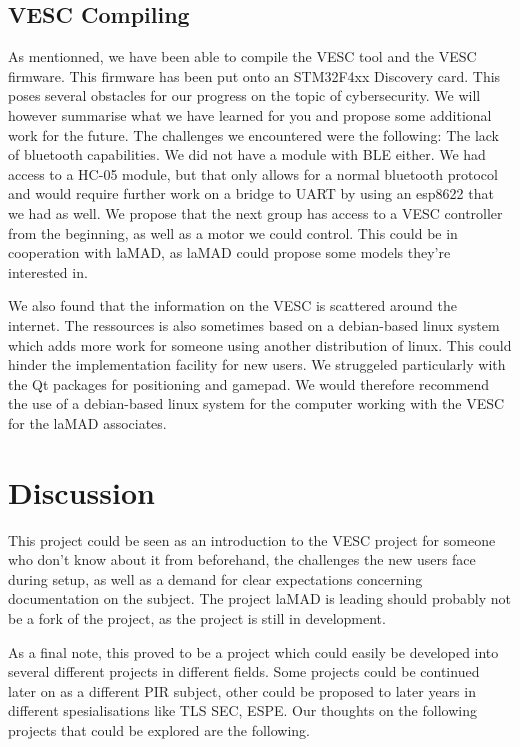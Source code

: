\documentclass[conference]{IEEEtran}
\begin{document}
\subsection{VESC Compiling}
As mentionned, we have been able to compile the VESC tool and the VESC firmware. This firmware has been put onto an 
STM32F4xx Discovery card. This poses several obstacles for our progress on the topic of cybersecurity. We will however 
summarise what we have learned for you and propose some additional work for the future. The challenges we encountered 
were the following: The lack of bluetooth capabilities. We did not have a module with BLE either. We had access to a 
HC-05 module, but that only allows for a normal bluetooth protocol and would require further work on a bridge to UART 
by using an esp8622 that we had as well. We propose that the next group has access to a VESC controller from the 
beginning, as well as a motor we could control. This could be in cooperation with laMAD, as laMAD could propose 
some models they're interested in.

We also found that the information on the VESC is scattered around the internet. The ressources is also sometimes 
based on a debian-based linux system which adds more work for someone using another distribution of linux. This could 
hinder the implementation facility for new users. We struggeled particularly with the Qt packages for positioning and 
gamepad. We would therefore recommend the use of a debian-based linux system for the computer working with the VESC 
for the laMAD associates.


\section{Discussion}
This project could be seen as an introduction to the VESC project for someone who don't know about it from beforehand, 
the challenges the new users face during setup, as well as a demand for clear expectations concerning documentation 
on the subject. The project laMAD is leading should probably not be a fork of the project, as the project is still 
in development.

As a final note, this proved to be a project which could easily be developed into several different projects in 
different fields. Some projects could be continued later on as a different PIR subject, other could be proposed to 
later years in different spesialisations like TLS SEC, ESPE. Our thoughts on the following projects that could be 
explored are the following.
\end{document}
